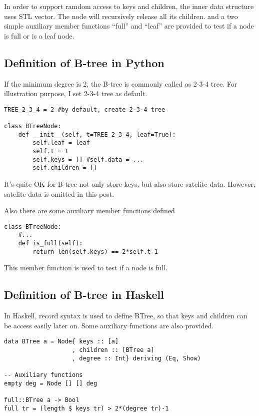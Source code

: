 \documentclass{article}
\begin{document}
In order to support ramdom access to keys and children, the
inner data structure uses STL vector. The node will recursively
release all its children. and a two simple auxiliary member
functions ``full'' and ``leaf'' are provided to test if a node
is full or is a leaf node.

\subsection*{Definition of B-tree in Python}

If the minimum degree is 2, the B-tree is commonly called as 2-3-4 tree.
For illustration purpose, I set 2-3-4 tree as default.

\lstset{language=Python}
\begin{lstlisting}
TREE_2_3_4 = 2 #by default, create 2-3-4 tree

class BTreeNode:
    def __init__(self, t=TREE_2_3_4, leaf=True):
        self.leaf = leaf
        self.t = t
        self.keys = [] #self.data = ...
        self.children = []
\end{lstlisting}

It's quite OK for B-tree not only store keys, but also store satelite data.
However, satelite data is omitted in this post.

Also there are some auxiliary member functions defined

\begin{lstlisting}
class BTreeNode:
    #...
    def is_full(self):
        return len(self.keys) == 2*self.t-1
\end{lstlisting}

This member function is used to test if a node is full.

\subsection*{Definition of B-tree in Haskell}
In Haskell, record syntax is used to define BTree, so that keys and children 
can be access easily later on. Some auxiliary functions are also provided.

\lstset{language=Haskell}
\begin{lstlisting}
data BTree a = Node{ keys :: [a]
                   , children :: [BTree a]
                   , degree :: Int} deriving (Eq, Show)

-- Auxiliary functions
empty deg = Node [] [] deg

full::BTree a -> Bool
full tr = (length $ keys tr) > 2*(degree tr)-1
\end{lstlisting} %
\end{document}
